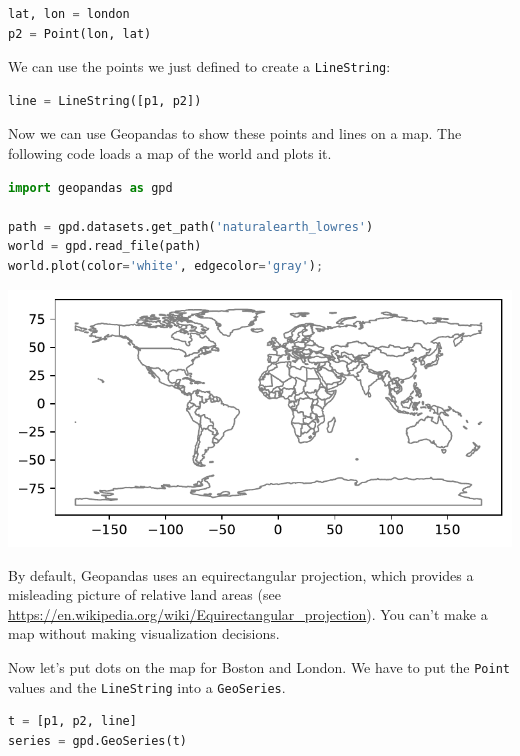 \begin{lstlisting}[language=Python,style=source]
lat, lon = london
p2 = Point(lon, lat)
\end{lstlisting}

We can use the points we just defined to create a
\passthrough{\lstinline!LineString!}:

\begin{lstlisting}[language=Python,style=source]
line = LineString([p1, p2])
\end{lstlisting}

Now we can use Geopandas to show these points and lines on a map. The
following code loads a map of the world and plots it.

\begin{lstlisting}[language=Python,style=source]
import geopandas as gpd

path = gpd.datasets.get_path('naturalearth_lowres')
world = gpd.read_file(path)
world.plot(color='white', edgecolor='gray');
\end{lstlisting}

\begin{center}
\includegraphics[scale=0.75]{02_times_files/02_times_123_0.pdf}
\end{center}

By default, Geopandas uses an equirectangular projection, which provides
a misleading picture of relative land areas (see
\url{https://en.wikipedia.org/wiki/Equirectangular_projection}). You
can't make a map without making visualization decisions.

Now let's put dots on the map for Boston and London. We have to put the
\passthrough{\lstinline!Point!} values and the
\passthrough{\lstinline!LineString!} into a
\passthrough{\lstinline!GeoSeries!}.

\begin{lstlisting}[language=Python,style=source]
t = [p1, p2, line]
series = gpd.GeoSeries(t)
\end{lstlisting}

